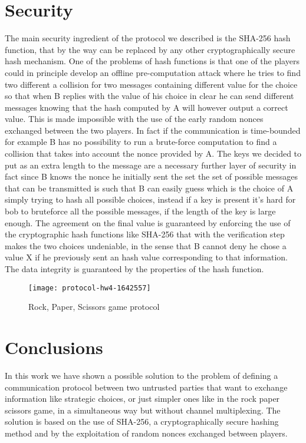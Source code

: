 \documentclass[11pt]{article}
\begin{document}
\section{Security}
The main security ingredient of the protocol we described is the SHA-256 hash function, that by the way can be replaced by any other cryptographically secure hash mechanism. One of the problems of hash functions is that one of the players could in principle develop an offline pre-computation attack where he tries to find two different a collision for two messages containing different value for the choice so that when B replies with the value of his choice in clear he can send different messages knowing that the hash computed by A will however output a correct value. This is made impossible with the use of the early random nonces exchanged between the two players. In fact if the communication is time-bounded for example B has no possibility to run a brute-force computation to find a collision that takes into account the nonce provided by A. The keys we decided to put as an extra length to the message are a necessary further layer of security in fact since B knows the nonce he initially sent the set the set of possible messages that can be transmitted is such that B can easily guess which is the choice of A simply trying to hash all possible choices, instead if a key is present it's hard for bob to bruteforce all the possible messages, if the length of the key is large enough. The agreement on the final value is guaranteed by enforcing the use of the cryptographic hash functions like SHA-256 that with the verification step makes the two choices undeniable, in the sense that B cannot deny he chose a value X if he previously sent an hash value corresponding to that information. The data integrity is guaranteed by the properties of the hash function.
\newline
\begin{figure}[h]
\texttt{[image: protocol-hw4-1642557]}
\centering
\caption{Rock, Paper, Scissors game protocol}
\label{fig:protocol}
\end{figure}
\clearpage

\section{Conclusions}
In this work we have shown a possible solution to the problem of defining a communication protocol between two untrusted parties that want to exchange information like strategic choices, or just simpler ones like in the rock paper scissors game, in a simultaneous way but without channel multiplexing. The solution is based on the use of SHA-256, a cryptographically secure hashing method and by the exploitation of random nonces exchanged between players.

\nocite{*} %
 

\end{document}
